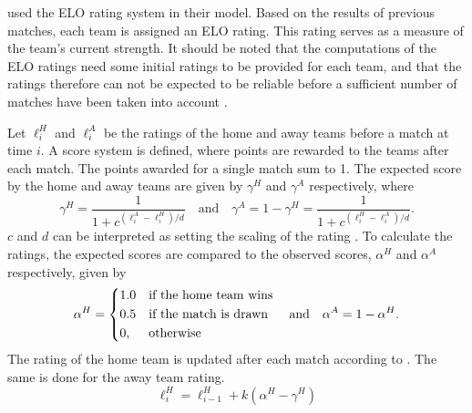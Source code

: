 \citet{bib:hvattum-arntzen-2010} used the ELO rating system in their model. Based on the results of previous matches, each team is assigned an ELO rating. This rating serves as a measure of the team's current strength. It should be noted that the computations of the ELO ratings need some initial ratings to be provided for each team, and that the ratings therefore can not be expected to be reliable before a sufficient number of matches have been taken into account \citep{bib:hvattum-arntzen-2010}.

Let $\ell_{i}^{H}$ and $\ell_{i}^{A}$ be the ratings of the home and away teams before a match at time $i$. A score system is defined, where points are rewarded to the teams after each match. The points awarded for a single match sum to 1. The expected score by the home and away teams are given by $\gamma^{H}$ and $\gamma^{A}$ respectively, where
\begin{equation*}
    \gamma^{H} = \frac{1}{1 + c^{(\ell_{i}^{A} - \ell_{i}^{H}) / d}} \quad \text{and} \quad
    \gamma^{A} = 1 - \gamma^{H} = \frac{1}{1 + c^{(\ell_{i}^{H} - \ell_{i}^{A}) / d}}.
\end{equation*}
$c$ and $d$ can be interpreted as setting the scaling of the rating \citep{bib:hvattum-arntzen-2010}. To calculate the ratings, the expected scores are compared to the observed scores, $\alpha^{H}$ and $\alpha^{A}$ respectively, given by
\begin{equation*}
    \alpha^{H} =
    \begin{dcases}
        1.0     & \text{if the home team wins} \\
        0.5     & \text{if the match is drawn} \\
        0,      & \text{otherwise}
    \end{dcases}
    \quad \text{and} \quad
    \alpha^{A} = 1 - \alpha^{H}.
\end{equation*}
The rating of the home team is updated after each match according to . The same is done for the away team rating.
\begin{equation}
    \ell_{i}^{H} = \ell_{i-1}^{H} + k (\alpha^{H} - \gamma^{H})
    \label{eq:hvattum-arntzen-rating-update}
\end{equation}

